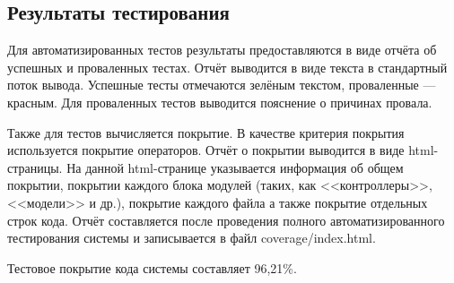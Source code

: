 \subsection{Результаты тестирования}

Для автоматизированных тестов результаты предоставляются в виде отчёта об успешных и проваленных тестах. Отчёт выводится в виде текста в стандартный поток вывода. Успешные тесты отмечаются зелёным текстом, проваленные --- красным. Для проваленных тестов выводится пояснение о причинах провала.

Также для тестов вычисляется покрытие. В качестве критерия покрытия используется покрытие операторов. Отчёт о покрытии выводится в виде html-страницы. На данной html-странице указывается информация об общем покрытии, покрытии каждого блока модулей (таких, как <<контроллеры>>, <<модели>> и др.), покрытие каждого файла а также покрытие отдельных строк кода. Отчёт составляется после проведения полного автоматизированного тестирования системы и записывается в файл coverage/index.html.

Тестовое покрытие кода системы составляет 96,21\%.
